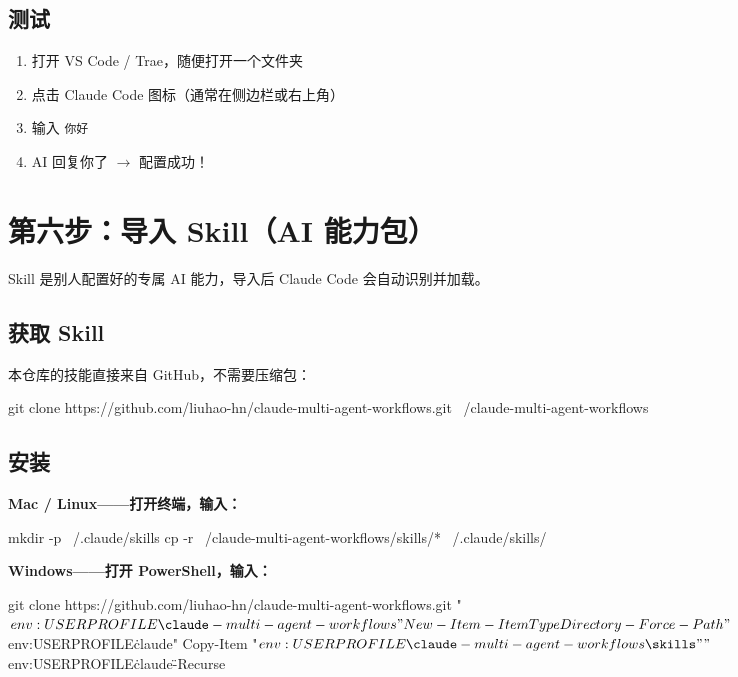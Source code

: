 \documentclass[12pt,a4paper]{ctexart}
\begin{document}
\subsection{测试}

\begin{enumerate}[nosep]
    \item 打开 VS Code / Trae，随便打开一个文件夹
    \item 点击 Claude Code 图标（通常在侧边栏或右上角）
    \item 输入 \texttt{你好}
    \item AI 回复你了 $\to$ 配置成功！
\end{enumerate}

\section{第六步：导入 Skill（AI 能力包）}

Skill 是别人配置好的专属 AI 能力，导入后 Claude Code 会自动识别并加载。

\subsection{获取 Skill}

本仓库的技能直接来自 GitHub，不需要压缩包：

\begin{shcode}
git clone https://github.com/liuhao-hn/claude-multi-agent-workflows.git ~/claude-multi-agent-workflows
\end{shcode}

\subsection{安装}

\textbf{Mac / Linux——打开终端，输入：}

\begin{shcode}
mkdir -p ~/.claude/skills
cp -r ~/claude-multi-agent-workflows/skills/* ~/.claude/skills/
\end{shcode}

\textbf{Windows——打开 PowerShell，输入：}

\begin{shcode}
git clone https://github.com/liuhao-hn/claude-multi-agent-workflows.git "$env:USERPROFILE\claude-multi-agent-workflows"
New-Item -ItemType Directory -Force -Path "$env:USERPROFILE\.claude\skills"
Copy-Item "$env:USERPROFILE\claude-multi-agent-workflows\skills\*" "$env:USERPROFILE\.claude\skills\" -Recurse
\end{shcode}
\end{document}
